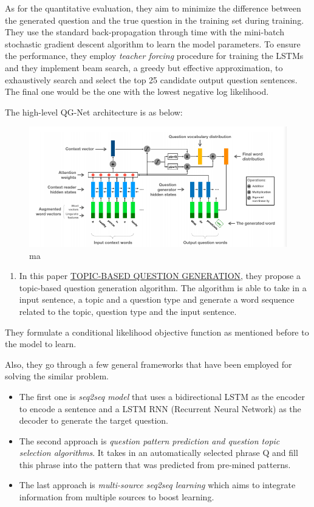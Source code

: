 \documentclass[]{book}
\providecommand{\tightlist}{%
  \setlength{\itemsep}{0pt}\setlength{\parskip}{0pt}}
\theoremstyle{definition}
\theoremstyle{definition}
\theoremstyle{definition}
\theoremstyle{remark}
\begin{document}
As for the quantitative evaluation, they aim to minimize the difference
between the generated question and the true question in the training set
during training. They use the standard back-propagation through time
with the mini-batch stochastic gradient descent algorithm to learn the
model parameters. To ensure the performance, they employ \emph{teacher
forcing} procedure for training the LSTMs and they implement beam
search, a greedy but effective approximation, to exhaustively search and
select the top 25 candidate output question sentences. The final one
would be the one with the lowest negative log likelihood.

The high-level QG-Net architecture is as below:

\begin{figure}
\centering
\includegraphics{img/qgnet.png}
\caption{ma}
\end{figure}

\begin{enumerate}
\def\labelenumi{\arabic{enumi}.}
\setcounter{enumi}{1}
\tightlist
\item
  In this paper
  \href{https://openreview.net/pdf?id=rk3pnae0b}{TOPIC-BASED QUESTION
  GENERATION}, they propose a topic-based question generation algorithm.
  The algorithm is able to take in a input sentence, a topic and a
  question type and generate a word sequence related to the topic,
  question type and the input sentence.
\end{enumerate}

They formulate a conditional likelihood objective function as mentioned
before to the model to learn.

Also, they go through a few general frameworks that have been employed
for solving the similar problem.

\begin{itemize}
\item
  The first one is \emph{seq2seq model} that uses a bidirectional LSTM
  as the encoder to encode a sentence and a LSTM RNN (Recurrent Neural
  Network) as the decoder to generate the target question.
\item
  The second approach is \emph{question pattern prediction and question
  topic selection algorithms}. It takes in an automatically selected
  phrase Q and fill this phrase into the pattern that was predicted from
  pre-mined patterns.
\item
  The last approach is \emph{multi-source seq2seq learning} which aims
  to integrate information from multiple sources to boost learning.
\end{itemize}
\end{document}
